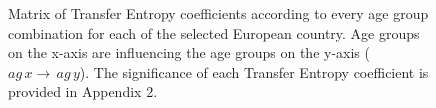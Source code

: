 \documentclass[
  number]{elsarticle}
\begin{document}
\begin{figure}


\caption{\label{fig-te}Matrix of Transfer Entropy coefficients according
to every age group combination for each of the selected European
country. Age groups on the x-axis are influencing the age groups on the
y-axis (\(ag\,x \rightarrow\,ag\,y\)). The significance of each Transfer
Entropy coefficient is provided in Appendix 2.}

\end{figure}%
\end{document}
